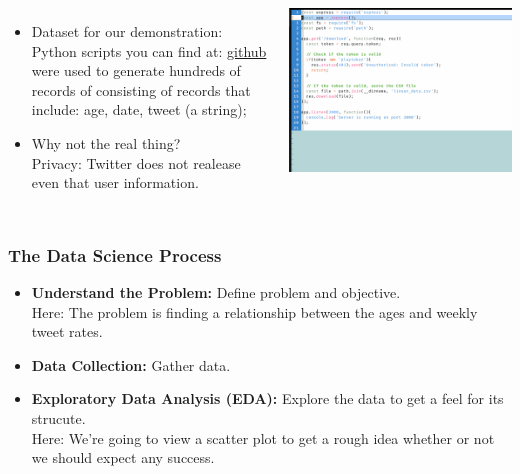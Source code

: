 \documentclass{beamer}
\newcounter{slidenum}
\begin{document}
\begin{frame}
\begin{columns}
{\begin{itemize}
	\item Dataset for our demonstration: Python scripts you can find at: 
		\href{https://github.com/jgcblue/lectureDS.git}{github}
		were used to generate hundreds of records of consisting of
		records that include: age, date, tweet (a string);
	\item Why not the real thing?\\
		Privacy: Twitter does not realease even that user information. 
\end{itemize}
}
\includegraphics[width=\textwidth]{server.png}
\end{columns}
\end{frame}

\begin{frame}
	\frametitle{The Data Science Process}
	\begin{itemize}
	\item \textbf{Understand the Problem:} Define problem and objective.\\

		Here: The problem is finding a relationship between the ages
		and weekly tweet rates.
  \item \textbf{Data Collection:} Gather data.\\
  \item \textbf{Exploratory Data Analysis (EDA):} Explore the data to get a
	  feel for its strucute. \\
	  Here: We're going to view a scatter plot to get a rough idea whether
	  or not we should expect any success.
\end{itemize}
\end{frame}
\end{document}
